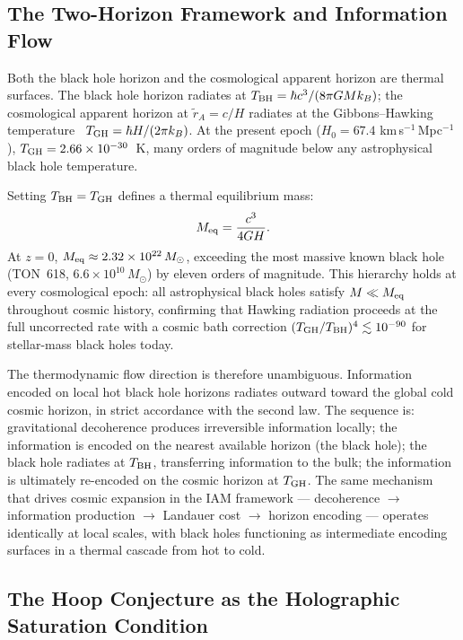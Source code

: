 \documentclass[twocolumn,a4paper,aps,prd,twocolumn,showpacs,notitlepage,superscriptaddress,nofootinbib]{article}
\begin{document}
\subsection{The Two-Horizon Framework and Information Flow}
\label{sec:two_horizon}

Both the black hole horizon and the cosmological apparent horizon are thermal
surfaces.  The black hole horizon radiates at $T_{\rm BH} = \hbar c^3 /
(8\pi G M k_B)$; the cosmological apparent horizon at $\tilde{r}_A = c/H$
radiates at the Gibbons--Hawking temperature~\citep{GibbonsHawking1977}
$T_{\rm GH} = \hbar H / (2\pi k_B)$.  At the present epoch ($H_0 = 67.4$
km\,s$^{-1}$\,Mpc$^{-1}$), $T_{\rm GH} = 2.66 \times 10^{-30}$~K, many
orders of magnitude below any astrophysical black hole temperature.

Setting $T_{\rm BH} = T_{\rm GH}$ defines a thermal equilibrium mass:
\begin{equation}
  M_{\rm eq} = \frac{c^3}{4GH}.
  \label{eq:meq}
\end{equation}
At $z = 0$, $M_{\rm eq} \approx 2.32 \times 10^{22}\,M_\odot$, exceeding
the most massive known black hole (TON~618, $6.6 \times 10^{10}\,M_\odot$)
by eleven orders of magnitude.  This hierarchy holds at every cosmological
epoch: all astrophysical black holes satisfy $M \ll M_{\rm eq}$ throughout
cosmic history, confirming that Hawking radiation proceeds at the full
uncorrected rate with a cosmic bath correction $(T_{\rm GH}/T_{\rm
BH})^4 \lesssim 10^{-90}$ for stellar-mass black holes today.

The thermodynamic flow direction is therefore unambiguous.  Information
encoded on local hot black hole horizons radiates outward toward the global
cold cosmic horizon, in strict accordance with the second law.  The sequence
is: gravitational decoherence produces irreversible information locally; the
information is encoded on the nearest available horizon (the black hole); the
black hole radiates at $T_{\rm BH}$, transferring information to the bulk;
the information is ultimately re-encoded on the cosmic horizon at $T_{\rm
GH}$.  The same mechanism that drives cosmic expansion in the IAM framework
--- decoherence $\to$ information production $\to$ Landauer cost $\to$
horizon encoding --- operates identically at local scales, with black holes
functioning as intermediate encoding surfaces in a thermal cascade from hot
to cold.

\subsection{The Hoop Conjecture as the Holographic Saturation Condition}
\label{sec:hoop}
\end{document}
